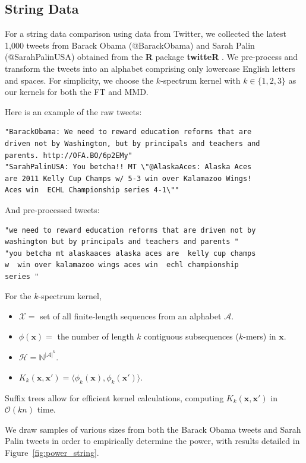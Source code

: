 \subsection{String Data}
\label{twitter_data}
For a string data comparison using data from Twitter, we collected the
latest 1,000 tweets from Barack Obama (@BarackObama) and Sarah Palin
(@SarahPalinUSA) obtained from the {\bf R} package {\bf twitteR}
\cite{twitteR}.  We pre-process and transform the tweets
into an alphabet comprising only lowercase English letters and spaces.
For simplicity, we
choose the $k$-spectrum kernel \cite{leslie2002spectrum} with
$k \in \{1, 2, 3 \}$
as our kernels for both the FT and MMD.

Here is an example of the raw tweets:
\begin{verbatim}
"BarackObama: We need to reward education reforms that are
driven not by Washington, but by principals and teachers and
parents. http://OFA.BO/6p2EMy"
"SarahPalinUSA: You betcha!! MT \"@AlaskaAces: Alaska Aces
are 2011 Kelly Cup Champs w/ 5-3 win over Kalamazoo Wings!
Aces win  ECHL Championship series 4-1\""
\end{verbatim}
And pre-processed tweets:
\begin{verbatim}
"we need to reward education reforms that are driven not by
washington but by principals and teachers and parents "
"you betcha mt alaskaaces alaska aces are  kelly cup champs
w  win over kalamazoo wings aces win  echl championship
series "
\end{verbatim}

For the $k$-spectrum kernel,
\begin{itemize}
\item $\mathcal{X} = $ set of all finite-length sequences from an alphabet $\mathcal{A}$.
\item $\phi({\mathbf x}) = $ the number of length $k$ contiguous
  subsequences ($k$-mers) in ${\mathbf x}$.
\item $\mathcal{H} = \mathbb{N}^{|\mathcal{A}|^k}$.
\item $K_k({\mathbf x}, {\mathbf x}') = \langle \phi_k({\mathbf x}), \phi_k({\mathbf x}') \rangle$.
\end{itemize}

Suffix trees allow for efficient kernel calculations, computing
$K_k({\mathbf x}, {\mathbf x}')$ in
$\mathcal{O}(kn)$ time.

We draw samples of various sizes from
both the Barack Obama tweets and Sarah Palin tweets in order to
empirically determine the power, with results detailed in
Figure~\ref{fig:power_string}.

